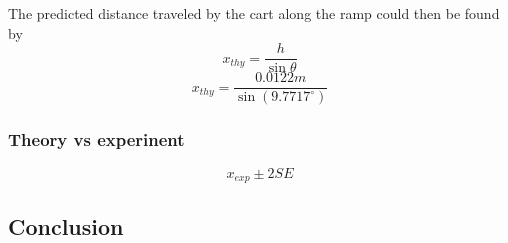 \documentclass[11pt, letterpaper, includehead]{article}
\begin{document}
The predicted distance traveled by the cart along the ramp could then be
found by 
$$x_{thy} = \frac{h}{\sin \theta}$$
$$x_{thy} = \frac{0.0122m}{\sin(9.7717^{\circ})}$$

\subsubsection{Theory vs experinent}
$$x_{exp} \pm 2SE$$


\subsection{Conclusion}
\end{document}
